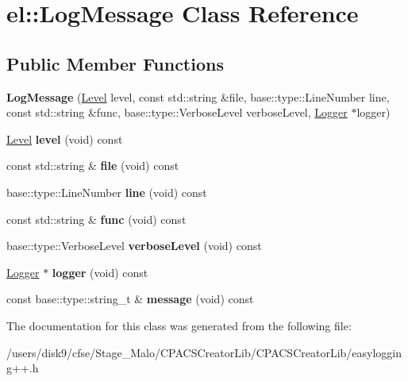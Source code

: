 \hypertarget{classel_1_1LogMessage}{\section{el\-:\-:Log\-Message Class Reference}
\label{classel_1_1LogMessage}
}
\subsection*{Public Member Functions}
\begin{DoxyCompactItemize}
\item 
\hypertarget{classel_1_1LogMessage_a0ac3d7462be1c375a39e2ecd0b7c6cea}{{\bfseries Log\-Message} (\hyperlink{namespaceel_ab0ac6091262344c52dd2d3ad099e8e36}{Level} level, const std\-::string \&file, base\-::type\-::\-Line\-Number line, const std\-::string \&func, base\-::type\-::\-Verbose\-Level verbose\-Level, \hyperlink{classel_1_1Logger}{Logger} $\ast$logger)}\label{classel_1_1LogMessage_a0ac3d7462be1c375a39e2ecd0b7c6cea}

\item 
\hypertarget{classel_1_1LogMessage_a09514a3bb7deae447c3141bc55b52d06}{\hyperlink{namespaceel_ab0ac6091262344c52dd2d3ad099e8e36}{Level} {\bfseries level} (void) const }\label{classel_1_1LogMessage_a09514a3bb7deae447c3141bc55b52d06}

\item 
\hypertarget{classel_1_1LogMessage_a8f72164d7bf31ea3b15a5c0201fca0c4}{const std\-::string \& {\bfseries file} (void) const }\label{classel_1_1LogMessage_a8f72164d7bf31ea3b15a5c0201fca0c4}

\item 
\hypertarget{classel_1_1LogMessage_aaba08793e6fe44335f6881c04a80f6b4}{base\-::type\-::\-Line\-Number {\bfseries line} (void) const }\label{classel_1_1LogMessage_aaba08793e6fe44335f6881c04a80f6b4}

\item 
\hypertarget{classel_1_1LogMessage_ae09cdff5620dcf8269b2b83bea722a2a}{const std\-::string \& {\bfseries func} (void) const }\label{classel_1_1LogMessage_ae09cdff5620dcf8269b2b83bea722a2a}

\item 
\hypertarget{classel_1_1LogMessage_a52e91b0dd3e5af96642622cc2a67aa88}{base\-::type\-::\-Verbose\-Level {\bfseries verbose\-Level} (void) const }\label{classel_1_1LogMessage_a52e91b0dd3e5af96642622cc2a67aa88}

\item 
\hypertarget{classel_1_1LogMessage_ae67b30a16a4115148ee32c9b2c91e03c}{\hyperlink{classel_1_1Logger}{Logger} $\ast$ {\bfseries logger} (void) const }\label{classel_1_1LogMessage_ae67b30a16a4115148ee32c9b2c91e03c}

\item 
\hypertarget{classel_1_1LogMessage_a0f34882ed8102061bb9bb247cb08a5c3}{const base\-::type\-::string\-\_\-t \& {\bfseries message} (void) const }\label{classel_1_1LogMessage_a0f34882ed8102061bb9bb247cb08a5c3}

\end{DoxyCompactItemize}


The documentation for this class was generated from the following file\-:\begin{DoxyCompactItemize}
\item 
/users/disk9/cfse/\-Stage\-\_\-\-Malo/\-C\-P\-A\-C\-S\-Creator\-Lib/\-C\-P\-A\-C\-S\-Creator\-Lib/easylogging++.\-h\end{DoxyCompactItemize}
